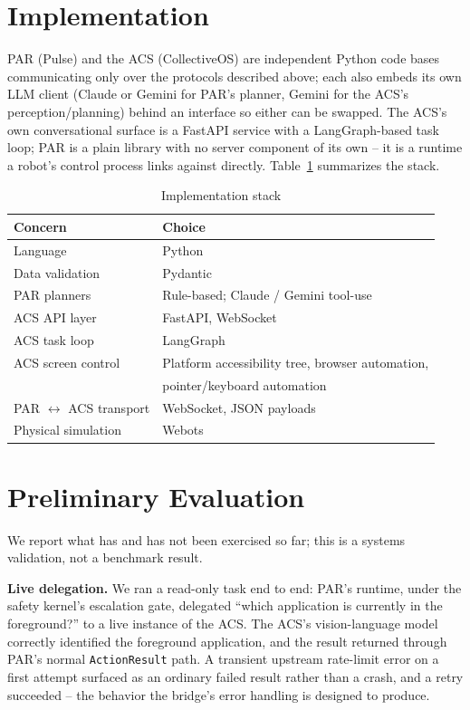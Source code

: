 \documentclass{article}
\begin{document}
\section{Implementation}
PAR (Pulse) and the ACS (CollectiveOS) are independent Python code bases
communicating only over the protocols described above; each also embeds
its own LLM client (Claude or Gemini for PAR's planner, Gemini for the
ACS's perception/planning) behind an interface so either can be swapped.
The ACS's own conversational surface is a FastAPI service with a
LangGraph-based task loop; PAR is a plain library with no server component
of its own -- it is a runtime a robot's control process links against
directly. Table~\ref{tab:stack} summarizes the stack.

\begin{table}[t]
\centering
\caption{Implementation stack}
\label{tab:stack}
\begin{tabular}{@{}ll@{}}
\toprule
\textbf{Concern} & \textbf{Choice} \\
\midrule
Language & Python \\
Data validation & Pydantic \\
PAR planners & Rule-based; Claude / Gemini tool-use \\
ACS API layer & FastAPI, WebSocket \\
ACS task loop & LangGraph \\
ACS screen control & Platform accessibility tree, browser automation,\\
 & pointer/keyboard automation \\
PAR $\leftrightarrow$ ACS transport & WebSocket, JSON payloads \\
Physical simulation & Webots \\
\bottomrule
\end{tabular}
\end{table}

\section{Preliminary Evaluation}
We report what has and has not been exercised so far; this is a systems
validation, not a benchmark result.

\textbf{Live delegation.} We ran a read-only task end to end: PAR's
runtime, under the safety kernel's escalation gate, delegated ``which
application is currently in the foreground?'' to a live instance of the
ACS. The ACS's vision-language model correctly identified the foreground
application, and the result returned through PAR's normal
\texttt{ActionResult} path. A transient upstream rate-limit error on a
first attempt surfaced as an ordinary failed result rather than a crash,
and a retry succeeded -- the behavior the bridge's error handling is
designed to produce.
\end{document}
